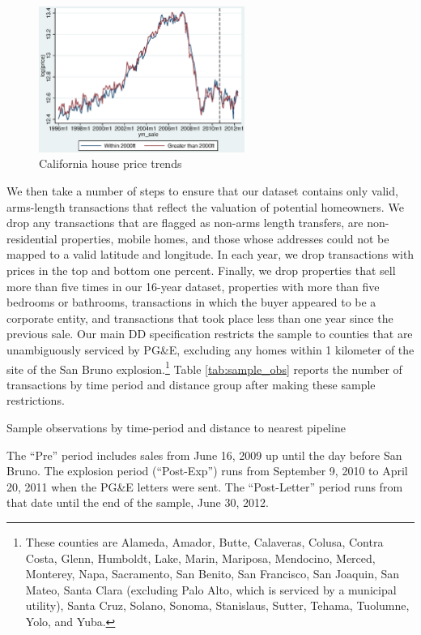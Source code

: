 \documentclass[12pt]{article}
\begin{document}
\begin{figure}[H]
\caption{California house price trends \label{fig:price_trends}}
\centering{}\includegraphics[width=0.6\textwidth]{../output/price_trend_full_sample.eps}
\end{figure}

We then take a number of steps to ensure that our dataset contains
only valid, arms-length transactions that reflect the valuation of
potential homeowners. We drop any transactions that are flagged as
non-arms length transfers, are non-residential properties, mobile
homes, and those whose addresses could not be mapped to a valid latitude
and longitude. In each year, we drop transactions with prices in the
top and bottom one percent. Finally, we drop properties that sell
more than five times in our 16-year dataset, properties with more than
five bedrooms or bathrooms, transactions in which the buyer appeared
to be a corporate entity, and transactions that took place less than
one year since the previous sale. Our main DD specification restricts
the sample to counties that are unambiguously serviced by PG\&E, excluding
any homes within 1 kilometer of the site of the San Bruno explosion.\footnote{These counties are Alameda, Amador, Butte, Calaveras, Colusa, Contra
Costa, Glenn, Humboldt, Lake, Marin, Mariposa, Mendocino, Merced,
Monterey, Napa, Sacramento, San Benito, San Francisco, San Joaquin,
San Mateo, Santa Clara (excluding Palo Alto, which is serviced by
a municipal utility), Santa Cruz, Solano, Sonoma, Stanislaus, Sutter,
Tehama, Tuolumne, Yolo, and Yuba.} Table \ref{tab:sample_obs} reports the number of transactions by
time period and distance group after making these sample restrictions. 

\begin{table}[H]
\caption{Sample observations by time-period and distance to nearest pipeline
\label{tab:sample_obs}}

\centering



\scriptsize

The ``Pre'' period includes sales from June 16, 2009 up until the
day before San Bruno. The explosion period (``Post-Exp'') runs from
September 9, 2010 to April 20, 2011 when the PG\&E letters were sent.
The ``Post-Letter'' period runs from that date until the end of
the sample, June 30, 2012. 
\end{table}
\end{document}
